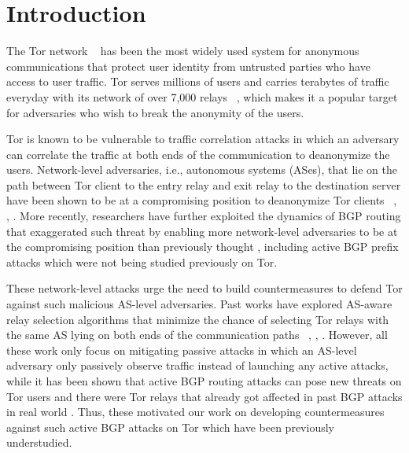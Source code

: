 \section{Introduction}

The Tor network ~\cite{dingledine2004tor} has been the most widely used system for anonymous communications that protect user identity from untrusted parties who have access to user traffic. Tor serves millions of users and carries terabytes of traffic everyday with its network of over 7,000 relays ~\cite{tormetrics}, which makes it a popular target for adversaries who wish to break the anonymity of the users. 

Tor is known to be vulnerable to traffic correlation attacks in which an adversary can correlate the traffic at both ends of the communication to deanonymize the users. Network-level adversaries, i.e., autonomous systems (ASes), that lie on the path between Tor client to the entry relay and exit relay to the destination server have been shown to be at a compromising position to deanonymize Tor clients ~\cite{feamster2004location}, \cite{edman2009awareness}, \cite{johnson2013users}. More recently, researchers have further exploited the dynamics of BGP routing that exaggerated such threat by enabling more network-level adversaries to be at the compromising position than previously thought \cite{sun2015raptor}, including active BGP prefix attacks which were not being studied previously on Tor. 

These network-level attacks urge the need to build countermeasures to defend Tor against such malicious AS-level adversaries. Past works have explored AS-aware relay selection algorithms that minimize the chance of selecting Tor relays with the same AS lying on both ends of the communication paths ~\cite{edman2009awareness}, \cite{akhoondi2012lastor}, \cite{starov2015measuring}. However, all these work only focus on mitigating passive attacks in which an AS-level adversary only passively observe traffic instead of launching any active attacks, while it has been shown that active BGP routing attacks can pose new threats on Tor users and there were Tor relays that already got affected in past BGP attacks in real world \cite{sun2015raptor}. Thus, these motivated our work on developing countermeasures against such active BGP attacks on Tor which have been previously understudied. 

